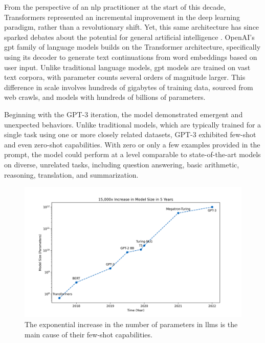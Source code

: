 \pskip

From the perspective of an \gls{nlp} practitioner at the start of this decade, Transformers represented an incremental improvement in the deep learning paradigm, rather than a revolutionary shift. Yet, this same architecture has since sparked debates about the potential for general artificial intelligence \cite{bubeck2023sparksartificialgeneralintelligence}. OpenAI's \gls{gpt} family of language models builds on the Transformer architecture, specifically using its decoder to generate text continuations from word embeddings based on user input. Unlike traditional language models, \gls{gpt} models are trained on vast text corpora, with parameter counts several orders of magnitude larger. This difference in scale involves hundreds of gigabytes of training data, sourced from web crawls, and models with hundreds of billions of parameters.

\pskip

Beginning with the GPT-3 iteration, the model demonstrated emergent and unexpected behaviors. Unlike traditional models, which are typically trained for a single task using one or more closely related datasets, GPT-3 exhibited few-shot and even zero-shot capabilities. With zero or only a few examples provided in the prompt, the model could perform at a level comparable to state-of-the-art models on diverse, unrelated tasks, including question answering, basic arithmetic, reasoning, translation, and summarization.

\begin{figure}[h!]
    \centering
    \captionsetup{format=plain, font=small, labelfont=bf}
    \includegraphics[width=\linewidth]{figures/modelsizeincrease.png}
    \caption[Progression of Models Size in \glspl{llm}]{The exponential increase in the number of parameters in \glspl{llm} is the main cause of their few-shot capabilities.}
    \label{fig:sample_plot}
\end{figure}

